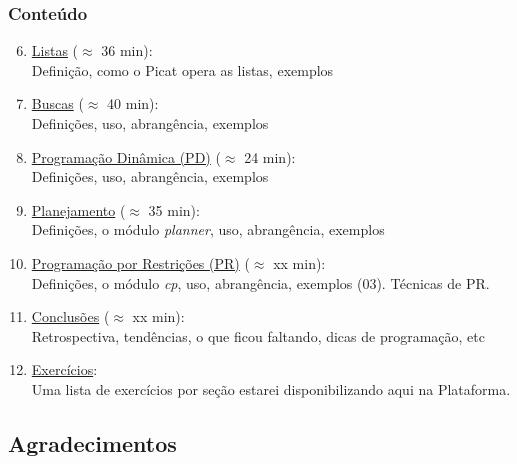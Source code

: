 			
\begin{frame}[fragile]
  \frametitle{Conteúdo}
  
  \begin{enumerate}

   \setcounter{enumi}{5}
    \item  \underline{Listas} ($\approx$ 36 min):\\
    Definição, como o Picat opera as listas, exemplos


    \pause
    \item  \underline{Buscas} ($\approx$ 40 min):\\
    Definições, uso, abrangência, exemplos

    \pause
    \item \underline{Programação Dinâmica (PD)} ($\approx$ 24 min):\\
        Definições, uso, abrangência, exemplos

    
    \pause
    \item \underline{Planejamento} ($\approx$ 35 min):\\
        Definições, o módulo \textit{planner}, uso, abrangência, exemplos

    \pause
		\item  \underline{Programação por Restrições (PR)} ($\approx$ xx min):\\
      Definições, o módulo \textit{cp}, uso, abrangência, exemplos (03).
      Técnicas de PR.

    \pause
		\item  \underline{Conclusões} ($\approx$ xx min):\\
    Retrospectiva, tendências, o que ficou faltando, dicas de programação, etc

    \pause
		\item  \underline{Exercícios}:\\
    Uma lista de exercícios por seção estarei disponibilizando aqui na Plataforma.

    
\end{enumerate}

\end{frame}


\subsection{Agradecimentos}

